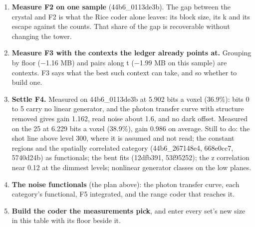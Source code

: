 \begin{enumerate}
\item \textbf{Measure F2 on one sample} (44b6\_\allowbreak{}0113de3b). The gap between the crystal and F2 is what the Rice coder alone leaves: its block size, its k and its escape against the counts. That share of the gap is recoverable without changing the tower.
\item \textbf{Measure F3 with the contexts the ledger already points at.} Grouping by floor (−1.16 MB) and pairs along t (−1.99 MB on this sample) are contexts. F3 says what the best such context can take, and so whether to build one.
\item \textbf{Settle F4.} Measured on 44b6\_\allowbreak{}0113de3b at 5.902 bits a voxel (36.9\%): bits 0 to 5 carry no linear generator, and the photon transfer curve with structure removed gives gain 1.162, read noise about 1.6, and no dark offset. Measured on the 25 at 6.229 bits a voxel (38.9\%), gain 0.986 on average. Still to do: the shot line above level 300, where it is assumed and not read; the constant regions and the spatially correlated category (44b6\_\allowbreak{}267148e4, 668e0cc7, 5740d24b) as functionals; the bent fits (12dfb391, 53f95252); the z correlation near 0.12 at the dimmest levels; nonlinear generator classes on the low planes.
\item \textbf{The noise functionals} (the plan above): the photon transfer curve, each category's functional, F5 integrated, and the range coder that reaches it.
\item \textbf{Build the coder the measurements pick}, and enter every set's new size in this table with its floor beside it.
\end{enumerate}
